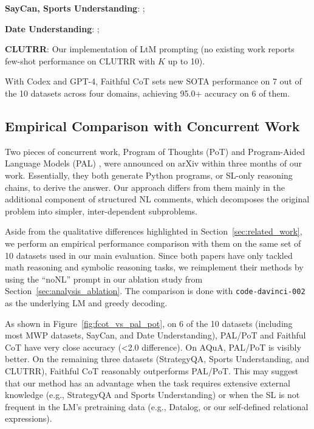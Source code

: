 \documentclass[11pt]{article}
\begin{document}
\textbf{SayCan, Sports Understanding}: \cite{wei_chain_2022};

\textbf{Date Understanding}: \cite{gao_pal_2022};

\textbf{CLUTRR}: Our implementation of LtM prompting \cite{zhou_least--most_2022} (no existing work reports few-shot performance on CLUTRR with $K$ up to 10).

With Codex and GPT-4, Faithful CoT sets new SOTA performance on 7 out of the 10 datasets across four domains, achieving 95.0+ accuracy on 6 of them.

\subsection{Empirical Comparison with Concurrent Work}
\label{sec:appendix_concurrent_work}



Two pieces of concurrent work, Program of Thoughts (PoT) \cite{chen_program_2022} and Program-Aided Language Models (PAL) \cite{gao_pal_2022}, were announced on arXiv within three months of our work. Essentially, they both generate Python programs, or SL-only reasoning chains, to derive the answer. Our approach differs from them mainly in the additional component of structured NL comments, which decomposes the original problem into simpler, inter-dependent subproblems. 

Aside from the qualitative differences highlighted in Section~\ref{sec:related_work}, we perform an empirical performance comparison with them on the same set of 10 datasets used in our main evaluation. Since both papers have only tackled math reasoning and symbolic reasoning tasks, we reimplement their methods by using the ``noNL'' prompt in our ablation study from Section~\ref{sec:analysis_ablation}. The comparison is done with \texttt{code-davinci-002} as the underlying LM and greedy decoding.

As shown in Figure~\ref{fig:fcot_vs_pal_pot}, on 6 of the 10 datasets (including most MWP datasets, SayCan, and Date Understanding), PAL/PoT and Faithful CoT have very close accuracy (<2.0 difference). On AQuA, PAL/PoT is visibly better. On the remaining three datasets (StrategyQA, Sports Understanding, and CLUTRR), Faithful CoT reasonably outperforms PAL/PoT. This may suggest that our method has an advantage when the task requires extensive external knowledge (e.g., StrategyQA and Sports Understanding) or when the SL is not frequent in the LM's pretraining data (e.g., Datalog, or our self-defined relational expressions). 
\end{document}
